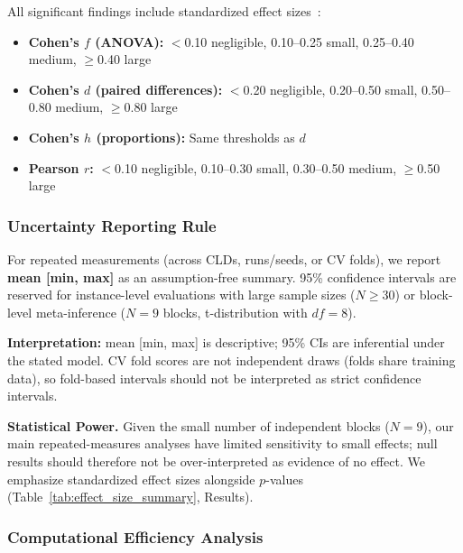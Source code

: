 All significant findings include standardized effect sizes~\cite{cohen1988statistical}:
\begin{itemize}[noitemsep]
    \item \textbf{Cohen's $f$ (ANOVA):} $<$0.10 negligible, 0.10--0.25 small, 0.25--0.40 medium, $\geq$0.40 large
    \item \textbf{Cohen's $d$ (paired differences):} $<$0.20 negligible, 0.20--0.50 small, 0.50--0.80 medium, $\geq$0.80 large
    \item \textbf{Cohen's $h$ (proportions):} Same thresholds as $d$
    \item \textbf{Pearson $r$:} $<$0.10 negligible, 0.10--0.30 small, 0.30--0.50 medium, $\geq$0.50 large
\end{itemize}

\subsubsection{Uncertainty Reporting Rule}
\label{sec:uncertainty_rule}

For repeated measurements (across CLDs, runs/seeds, or CV folds), we report \textbf{mean [min, max]} as an assumption-free summary. 95\% confidence intervals are reserved for instance-level evaluations with large sample sizes ($N \geq 30$) or block-level meta-inference ($N=9$ blocks, t-distribution with $df=8$).

\textbf{Interpretation:} mean [min, max] is descriptive; 95\% CIs are inferential under the stated model. CV fold scores are not independent draws (folds share training data), so fold-based intervals should not be interpreted as strict confidence intervals.

\textbf{Statistical Power.} Given the small number of independent blocks ($N=9$), our main repeated-measures analyses have limited sensitivity to small effects; null results should therefore not be over-interpreted as evidence of no effect. We emphasize standardized effect sizes alongside $p$-values (Table~\ref{tab:effect_size_summary}, Results).

\subsubsection{Computational Efficiency Analysis}
\label{sec:computational_efficiency}

